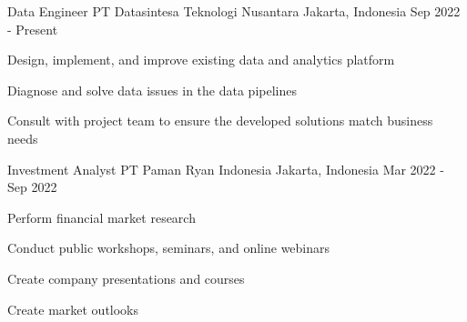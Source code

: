 

\begin{cventries}

  \cventry
    {Data Engineer} %
    {PT Datasintesa Teknologi Nusantara} %
    {Jakarta, Indonesia} %
    {Sep 2022 - Present} %
    {
      \begin{cvitems} %
        \item {Design, implement, and improve existing data and analytics platform}
        \item {Diagnose and solve data issues in the data pipelines}
        \item {Consult with project team to ensure the developed solutions match business needs}
      \end{cvitems}
    }

  \cventry
    {Investment Analyst} %
    {PT Paman Ryan Indonesia} %
    {Jakarta, Indonesia} %
    {Mar 2022 - Sep 2022} %
    {
      \begin{cvitems} %
        \item {Perform financial market research}
        \item {Conduct public workshops, seminars, and online webinars}
        \item {Create company presentations and courses}
        \item {Create market outlooks}
      \end{cvitems}
    }


\end{cventries}
